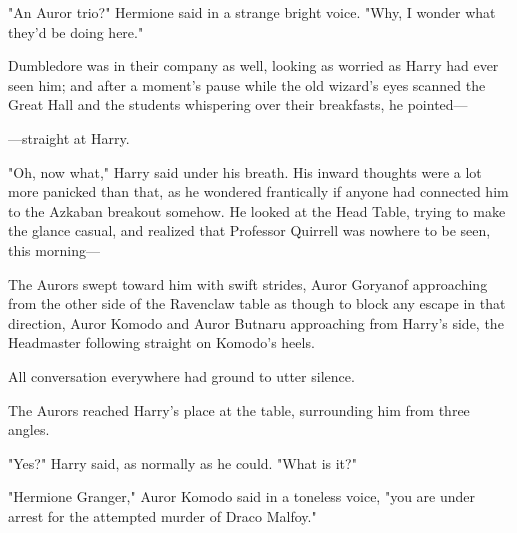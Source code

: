 "An Auror trio?" Hermione said in a strange bright voice. "Why, I wonder what 
they'd be doing here."

Dumbledore was in their company as well, looking as worried as Harry had ever 
seen him; and after a moment's pause while the old wizard's eyes scanned the 
Great Hall and the students whispering over their breakfasts, he pointed---

---straight at Harry.

"Oh, now what," Harry said under his breath. His inward thoughts were a lot 
more panicked than that, as he wondered frantically if anyone had connected him 
to the Azkaban breakout somehow. He looked at the Head Table, trying to make 
the glance casual, and realized that Professor Quirrell was nowhere to be seen, 
this morning---

The Aurors swept toward him with swift strides, Auror Goryanof approaching from 
the other side of the Ravenclaw table as though to block any escape in that 
direction, Auror Komodo and Auror Butnaru approaching from Harry's side, the 
Headmaster following straight on Komodo's heels.

All conversation everywhere had ground to utter silence.

The Aurors reached Harry's place at the table, surrounding him from three 
angles.

"Yes?" Harry said, as normally as he could. "What is it?"

"Hermione Granger," Auror Komodo said in a toneless voice, "you are under 
arrest for the attempted murder of Draco Malfoy."